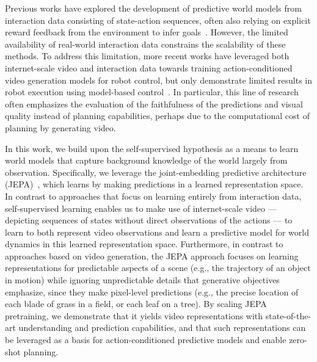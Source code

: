 \documentclass[]{fairmeta}
\begin{document}
Previous works have explored the development of predictive world models from interaction data consisting of state-action sequences, often also relying on explicit reward feedback from the environment to infer goals~\citep{sutton1981adaptive,fragkiadaki2015learning,ha2018world,hafner2019learning,hansen2022temporal}. However, the limited availability of real-world interaction data constrains the scalability of these methods.
To address this limitation, more recent works have leveraged both internet-scale video and interaction data towards training action-conditioned video generation models for robot control, but only demonstrate limited results in robot execution using model-based control~\citep{hu2023gaia,yang2024learning,bruce2024genie,agarwal2025cosmos}.
In particular, this line of research often emphasizes the evaluation of the faithfulness of the predictions and visual quality instead of planning capabilities, perhaps due to the computational cost of planning by generating video.

In this work, we build upon the self-supervised hypothesis as a means to learn world models that capture background knowledge of the world largely from observation. Specifically, we leverage the joint-embedding predictive architecture (JEPA)~\citep{lecun2022path}, which learns by making predictions in a learned representation space. 
In contrast to approaches that focus on learning entirely from interaction data, self-supervised learning enables us to make use of internet-scale video --- depicting sequences of states without direct observations of the actions ---
to learn to both represent video observations and learn a predictive model for world dynamics in this learned representation space.
Furthermore, in contrast to approaches based on video generation, the JEPA approach focuses on learning representations for predictable aspects of a scene (e.g., the trajectory of an object in motion) while ignoring unpredictable details that generative objectives emphasize, since they make pixel-level predictions (e.g., the precise location of each blade of grass in a field, or each leaf on a tree).
By scaling JEPA pretraining, we demonstrate that it yields video representations with state-of-the-art understanding and prediction capabilities, and that such representations can be leveraged as a basis for action-conditioned predictive models and enable zero-shot planning. 
\end{document}
